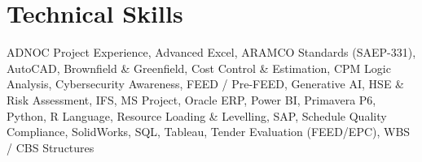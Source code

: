 \documentclass[11pt,a4paper]{article}
\begin{document}
\section{Technical Skills}
\noindent ADNOC Project Experience, Advanced Excel, ARAMCO Standards (SAEP-331), AutoCAD, Brownfield \& Greenfield, Cost Control \& Estimation, CPM Logic Analysis, Cybersecurity Awareness, FEED / Pre-FEED, Generative AI, HSE \& Risk Assessment, IFS, MS Project, Oracle ERP, Power BI, Primavera P6, Python, R Language, Resource Loading \& Levelling, SAP, Schedule Quality Compliance, SolidWorks, SQL, Tableau, Tender Evaluation (FEED/EPC), WBS / CBS Structures
\end{document}
